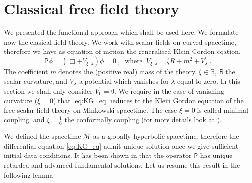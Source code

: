 \documentclass[10pt]{book}
\newcommand{\Mcal}{\mathcal{M}}
\newcommand{\Rbb}{\mathbb{R}}
\newcommand{\Psf}{\mathsf{P}}
\newcommand{\Rsf}{\mathsf{R}}
\theoremstyle{break}
\begin{document}
\section{Classical free field theory}


We presented the functional approach which shall be used here. We formulate now the clasical field theory. We work with scalar fields on curved spacetime, therefore we have as equation of motion the generalised Klein Gordon eqation.%
%
\begin{equation*} 
\Psf \phi = \left( \Box + V_{\xi,\lambda} \right) \phi = 0 \ , \
\mbox{ where } \ V_{\xi,\lambda} = \xi R + m^2 + V^\prime_\lambda \ . 
\label{eq:KG_eq}
\end{equation*}
%
The coefficient $m$ denotes the (positive real) mass of the theory, $\xi \in \Rbb$, $\Rsf$ the scalar curvature, and $V^\prime_\lambda$ a potential which vanishes for $\lambda$ equal to zero. In this section we shall only consider $V^\prime_0=0$. We require in the case of vanishing curvature ($\xi=0$) that \eqref{eq:KG_eq} reduces to the Klein Gordon equation of the free scalar field theory on Minkowski spacetime. The case $\xi=0$ is called minimal coupling, and $\xi=\frac16$ the conformally coupling (for more details look at \cite{waldGR}).


\bigskip


We defined the spacetime $\Mcal$ as a globally hyperbolic spacetime, therefore the differential equation \eqref{eq:KG_eq} admit unique solution once we give sufficient initial data conditions. It has been shown in \cite{baer_wave_2008} that the operator $\Psf$ has unique retarded and advanced fundamental solutions. Let us resume this result in the following lemma \cite{hack_cosmological_2015}.
\end{document}
